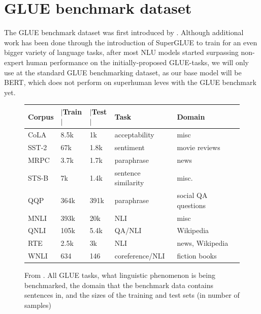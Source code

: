 \documentclass[a4paper,12pt,twoside,openright]{report}
\begin{document}
\section{GLUE benchmark dataset}

The GLUE benchmark dataset was first introduced by \cite{wang19}.
Although additional work has been done through the introduction of SuperGLUE \cite{wang19b} to train for an even bigger variety of language tasks, after most NLU models started surpassing non-expert human performance on the initially-proposed GLUE-tasks, we will only use at the standard GLUE benchmarking dataset, as our base model will be BERT, which does not perform on superhuman leves with the GLUE benchmark yet.

\begin{figure}[H]
\center
\begin{tabular}{
 l %
 l %
 l
 l
 l
 l
}
\toprule
\textbf{Corpus} & \textbf{ $|$Train$|$ } &\textbf{$|$Test$|$} & \textbf{Task} & \textbf{Domain}  \\
\midrule
CoLA  & 8.5k  &  1k   & acceptability &  misc \\

SST-2 & 67k &  1.8k  & sentiment &  movie reviews \\

MRPC & 3.7k &  1.7k & paraphrase & news \\
          
STS-B & 7k &  1.4k    & sentence similarity &  misc. \\
      
QQP & 364k &  391k & paraphrase  &  social QA questions\\	

MNLI & 393k &  20k  & NLI  &  misc \\

QNLI & 105k &  5.4k & QA/NLI &  Wikipedia \\

RTE & 2.5k &  3k      & NLI &  news, Wikipedia \\

WNLI & 634 &  146   & coreference/NLI & fiction books \\

      
\bottomrule
\end{tabular}
\caption{From \cite{wang19}. All GLUE tasks, what linguistic phenomenon is being benchmarked, the domain that the benchmark data contains sentences in, and the sizes of the training and test sets (in number of samples)}
\end{figure}
\end{document}
